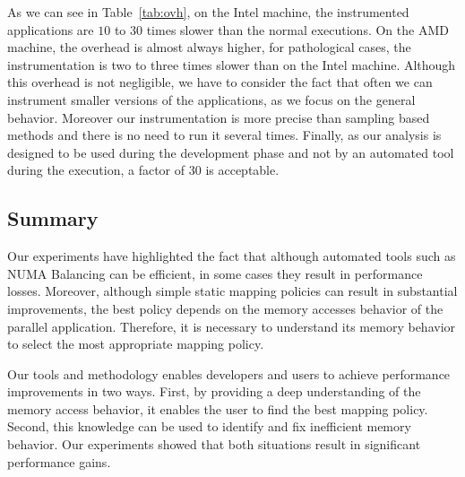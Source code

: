 As we can see in Table~\ref{tab:ovh}, on the Intel machine,
the instrumented applications are $10$ to $30$ times slower than the normal
executions. On the AMD machine, the overhead is almost always higher, for
pathological cases, the instrumentation is two to three times slower than on
the Intel machine.
Although this overhead is not negligible, we have to consider the fact that often we can instrument
smaller versions of the applications, as we focus on the general behavior.
Moreover our instrumentation is more precise than sampling based methods and
there is no need to run it several times. Finally, as our
analysis is designed to be used during the development phase and not by an
automated tool during the execution, a factor of $30$ is acceptable.

\subsection{Summary}

Our experiments have highlighted the fact that although automated tools such
as NUMA Balancing can be efficient, in some cases they result in
performance losses. Moreover, although simple static mapping policies
can result in substantial improvements, the best policy depends on the memory
accesses behavior of the parallel application. Therefore, it is necessary to understand its memory behavior to
select the most appropriate mapping policy.

Our tools and methodology enables developers and users to achieve performance improvements in two ways. First, by
providing a deep understanding of the memory access behavior, it enables the user to
find the best mapping policy. Second, this knowledge can be used to
identify and fix inefficient memory behavior. Our experiments showed that both
situations result in significant performance gains.
